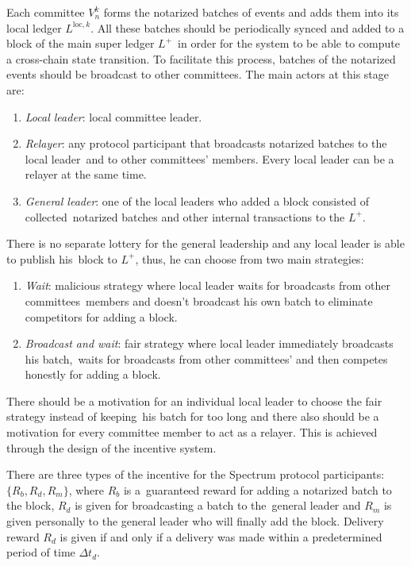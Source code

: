 Each committee $V_n^k$ forms the notarized batches of events and adds them into its local ledger $L^{\text{loc}, k}$.
All these batches should be periodically synced and added to a block of the main super ledger $L^+$\
in order for the system to be able to compute a cross-chain state transition.
To facilitate this process, batches of the notarized events should be broadcast to other committees.
The main actors at this stage are:
\begin{enumerate}
    \item \emph{Local leader}: local committee leader.
    \item \emph{Relayer}: any protocol participant that broadcasts notarized batches to the local leader\
    and to other committees' members.
    Every local leader can be a relayer at the same time.
    \item \emph{General leader}: one of the local leaders who added a block consisted of collected\
    notarized batches and other internal transactions to the $L^+$.
\end{enumerate}

There is no separate lottery for the general leadership and any local leader is able to publish his\
block to $L^+$, thus, he can choose from two main strategies:
\begin{enumerate}
    \item \emph{Wait}: malicious strategy where local leader waits for broadcasts from other committees\
    members and doesn't broadcast his own batch to eliminate competitors for adding a block.
    \item \emph{Broadcast and wait}: fair strategy where local leader immediately broadcasts his batch,\
    waits for broadcasts from other committees' and then competes honestly for adding a block.
\end{enumerate}
There should be a motivation for an individual local leader to choose the fair strategy instead of keeping\
his batch for too long and there also should be a motivation for every committee member to act as a relayer.
This is achieved through the design of the incentive system.

There are three types of the incentive for the Spectrum protocol participants: ${\{R_b, R_d, R_m\}}$, where $R_b$ is a\
guaranteed reward for adding a notarized batch to the block, $R_d$ is given for broadcasting a batch to the\
general leader and $R_m$ is given personally to the general leader who will finally add the block.
Delivery reward $R_d$ is given if and only if a delivery was made within a predetermined period of time $\Delta t_d$.

